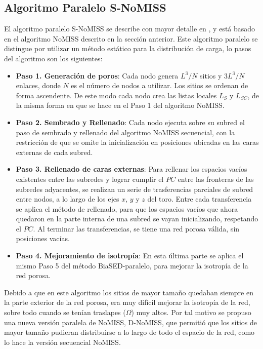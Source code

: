 \subsection{Algoritmo Paralelo S-NoMISS}
\label{subsubsec:ps-nomiss}
El algoritmo paralelo S-NoMISS se describe con mayor detalle en \cite{ref4}, y está basado en el algoritmo NoMISS descrito en la sección 
anterior. Este algoritmo paralelo se distingue por utilizar un método estático para la distribución de carga, 
lo pasos del algoritmo son los siguientes:

\begin{itemize}
\item[] \textbf{Paso 1. Generación de poros}: Cada nodo genera $L^3/N$ sitios y $3L^3/N$ enlaces, donde $N$ es el número de nodos a utilizar. Los sitios se ordenan de forma ascendente. De este modo cada nodo crea las listas locales 
$L_S$ y $L_{SC}$, de la misma forma en que se hace en el Paso 1 del algoritmo NoMISS.

\item[] \textbf{Paso 2. Sembrado y Rellenado}: Cada nodo ejecuta sobre su subred el paso de sembrado y rellenado del algoritmo NoMISS secuencial,
con la restricción de que se omite la inicialización en posiciones ubicadas en las caras externas de cada subred.

\item[] \textbf{Paso 3. Rellenado de caras externas}: Para rellenar los espacios vacíos existentes entre las subredes y lograr cumplir 
el $PC$ entre las fronteras de las subredes adyacentes, se realizan un serie de trasferencias parciales de subred entre nodos, 
a lo largo de los ejes $x$, $y$ y $z$ del toro. Entre cada transferencia se aplica el método de rellenado, para que los espacios vacíos
que ahora quedaron en la parte interna de una subred 
se vayan inicializando, respetando el $PC$. Al terminar las transferencias, se tiene una red porosa válida, sin posiciones vacías.

\item[] \textbf{Paso 4. Mejoramiento de isotropía}: En esta última parte se aplica el mismo Paso 5 del método BiaSED-paralelo, para mejorar la isotropía de la red porosa.
\end{itemize}

Debido a que en este algoritmo los sitios de mayor tamaño quedaban siempre en la parte exterior de la red porosa, era muy difícil
mejorar la isotropía de la red, sobre todo cuando se tenían traslapes ($\Omega$) muy altos. Por tal motivo se propuso una nueva versión paralela de NoMISS, D-NoMISS, que permitió que los sitios de mayor tamaño pudieran distribuirse a lo largo de todo el espacio de la red, como lo hace la versión secuencial NoMISS.  


